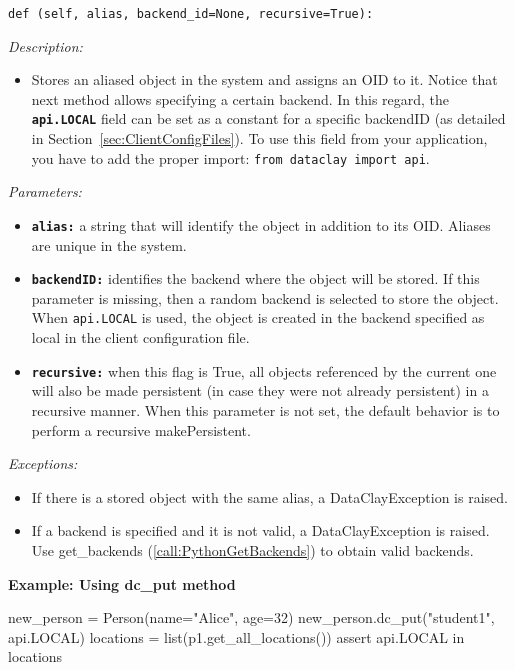 \begin{dBox}
\texttt{def  (self, alias, backend\_id=None, recursive=True):}
\LINE

{\it Description:}

\begin{itemize}
    \item Stores an aliased object in the system and assigns an OID to it. Notice that next method allows specifying a certain backend. In this regard, the \colorbox{basecolor!15}{\texttt{\bfseries api.LOCAL}} field can be set as a constant for a specific backendID (as detailed in Section~\ref{sec:ClientConfigFiles}). To use this field from your application, you have to add the proper import: \colorbox{basecolor!15}{\texttt{from dataclay import api}}.
\end{itemize}

{\it Parameters:}

\begin{itemize}
    \item \texttt{\bfseries alias:} a string that will identify the object in addition to its OID. Aliases are unique in the system.
    \item \texttt{\bfseries backendID:} identifies the backend where the object will be stored. If this parameter is missing, then a random backend is selected to store the object. When \texttt{api.LOCAL} is used, the object is created in the backend specified as local in the client configuration file.
    \item \texttt{\bfseries recursive:} when this flag is True, all objects referenced by the current one will also be made persistent (in case they were not already persistent) in a recursive manner. When this parameter is not set, the default behavior is to perform a recursive makePersistent.
\end{itemize}

{\it Exceptions:}

\begin{itemize}
    \item If there is a stored object with the same alias, a DataClayException is raised.
    \item If a backend is specified and it is not valid, a DataClayException is raised. Use get\_backends (\ref{call:PythonGetBackends}) to obtain valid backends.
\end{itemize}

\end{dBox}

\begin{tBox}
\textcolor{basecolor} {\bf Example: Using dc\_put method}
\begin{java}
new_person = Person(name="Alice", age=32)
new_person.dc_put("student1", api.LOCAL)
locations = list(p1.get_all_locations())
assert api.LOCAL in locations
\end{java}
\end{tBox}


